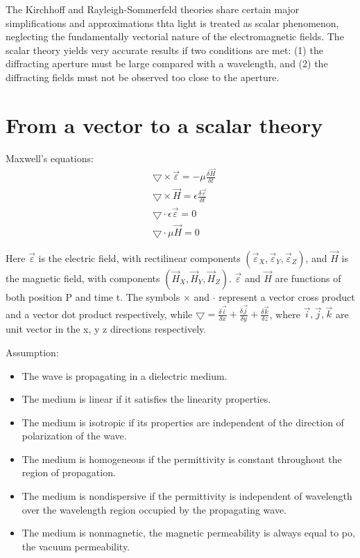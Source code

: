 \documentclass[../main.tex]{subfiles}
\begin{document}
	The Kirchhoff and Rayleigh-Sommerfeld theories share certain major simplifications and approximations thta light is treated as scalar phenomenon, neglecting the fundamentally vectorial nature of the electromagnetic fields. The scalar theory yields very accurate results if two conditions are met: (1) the diffracting aperture must be large compared with a wavelength, and (2) the diffracting fields must not be observed too close to the aperture. 

	\section{From a vector to a scalar theory}

	Maxwell's equations:
	\begin{align}
	&\boldsymbol{\bigtriangledown}\times\vec{\varepsilon}=-\mu\frac{\delta \vec{H}}{\delta t}\\
	&\boldsymbol{\bigtriangledown}\times\vec{H}=\epsilon\frac{\delta \vec{\varepsilon}}{\delta t}\\
	&\boldsymbol{\bigtriangledown}\cdot\epsilon\vec{\varepsilon}=0\\
	&\boldsymbol{\bigtriangledown}\cdot\mu\vec{H}=0
	\end{align}

	Here $\vec{\varepsilon}$ is the electric field, with rectilinear components $(\vec{\varepsilon}_{X},\vec{\varepsilon}_{Y},\vec{\varepsilon}_{Z})$, and $\vec{H}$ is the magnetic field, with components $(\vec{H}_{X},\vec{H}_{Y},\vec{H}_{Z})$. $\vec{\varepsilon}$ and $\vec{H}$ are functions of both position P and time t. The symbols $\times$ and $\cdot$ represent a vector cross product and a vector dot product respectively, while $\boldsymbol{\bigtriangledown}=\frac{\delta \vec{i}}{\delta x}+\frac{\delta \vec{j}}{\delta y}+\frac{\delta \vec{k}}{\delta z}$, where $\vec{i},\vec{j},\vec{k}$ are unit vector in the x, y z directions respectively.

	Assumption:
	\begin{itemize}
  	\item The wave is propagating in a dielectric medium.
  	\item The medium is linear if it satisfies the linearity properties.
  	\item The medium is isotropic if its properties are independent of the direction of polarization of the wave.
  	\item The medium is homogeneous if the permittivity is constant throughout the region of propagation.
  	\item The medium is nondispersive if the permittivity is independent of wavelength over the wavelength region occupied by the propagating wave.
  	\item The medium is nonmagnetic, the magnetic permeability is always equal to po, the vacuum permeability.
	\end{itemize}
\end{document}
